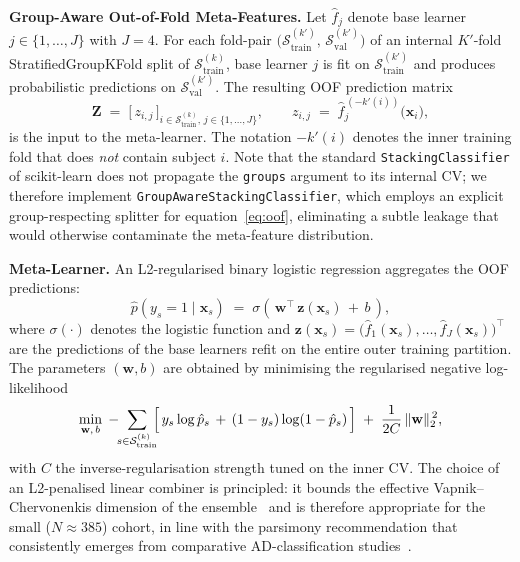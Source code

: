 \textbf{Group-Aware Out-of-Fold Meta-Features.} Let $\hat{f}_j$ denote base learner $j \in \{1, \ldots, J\}$ with $J = 4$. For each fold-pair $\bigl(\mathcal{S}_\mathrm{train}^{(k')},\, \mathcal{S}_\mathrm{val}^{(k')}\bigr)$ of an internal $K'$-fold StratifiedGroupKFold split of $\mathcal{S}_\mathrm{train}^{(k)}$, base learner $j$ is fit on $\mathcal{S}_\mathrm{train}^{(k')}$ and produces probabilistic predictions on $\mathcal{S}_\mathrm{val}^{(k')}$. The resulting OOF prediction matrix
\begin{equation}
\mathbf{Z} \;=\; \bigl[\, z_{i,j} \,\bigr]_{i \in \mathcal{S}_\mathrm{train}^{(k)},\, j \in \{1,\ldots,J\}}, \qquad z_{i,j} \;=\; \hat{f}_j^{\,(-k'(i))}\bigl(\mathbf{x}_i\bigr),
\label{eq:oof}
\end{equation}
is the input to the meta-learner. The notation $-k'(i)$ denotes the inner training fold that does \emph{not} contain subject $i$. Note that the standard \texttt{StackingClassifier} of scikit-learn does not propagate the \texttt{groups} argument to its internal CV; we therefore implement \texttt{GroupAwareStackingClassifier}, which employs an explicit group-respecting splitter for equation~\eqref{eq:oof}, eliminating a subtle leakage that would otherwise contaminate the meta-feature distribution.

\textbf{Meta-Learner.} An L2-regularised binary logistic regression aggregates the OOF predictions:
\begin{equation}
\hat{p}\!\left(y_s = 1 \mid \mathbf{x}_s\right) \;=\; \sigma\!\left(\, \mathbf{w}^{\!\top}\, \mathbf{z}(\mathbf{x}_s) \,+\, b \,\right),
\label{eq:meta}
\end{equation}
where $\sigma(\cdot)$ denotes the logistic function and $\mathbf{z}(\mathbf{x}_s) = \bigl(\hat{f}_1(\mathbf{x}_s), \ldots, \hat{f}_J(\mathbf{x}_s)\bigr)^{\!\top}$ are the predictions of the base learners refit on the entire outer training partition. The parameters $(\mathbf{w}, b)$ are obtained by minimising the regularised negative log-likelihood
\begin{equation}
\min_{\mathbf{w},\, b}\; -\!\!\sum_{s \in \mathcal{S}_\mathrm{train}^{(k)}}\!\!\Bigl[\, y_s \log \hat{p}_s \,+\, (1 - y_s) \log (1 - \hat{p}_s) \,\Bigr] \;+\; \frac{1}{2C}\,\|\mathbf{w}\|_2^{\,2},
\label{eq:meta_loss}
\end{equation}
with $C$ the inverse-regularisation strength tuned on the inner CV. The choice of an L2-penalised linear combiner is principled: it bounds the effective Vapnik--Chervonenkis dimension of the ensemble~\cite{vapnik1998} and is therefore appropriate for the small ($N \approx 385$) cohort, in line with the parsimony recommendation that consistently emerges from comparative AD-classification studies~\cite{battineni2020,salvatore2015}.

